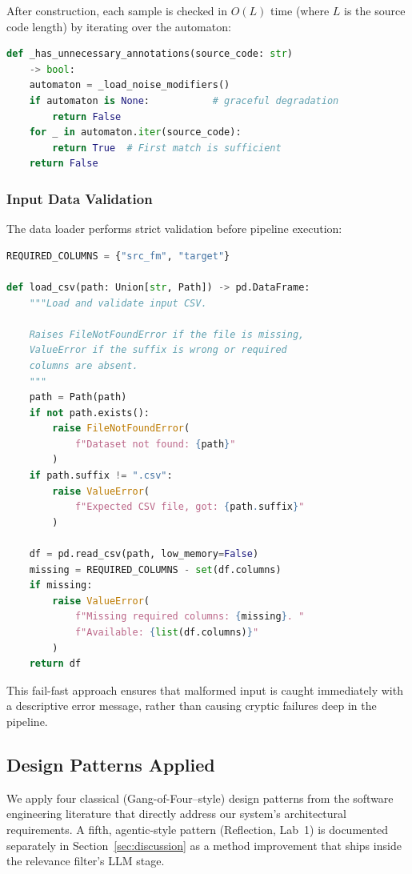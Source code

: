 \documentclass[acmlarge,nonacm,screen]{acmart}
\begin{document}
After construction, each sample is checked in $O(L)$ time (where $L$ is the source code length) by iterating over the automaton:

\begin{lstlisting}[language=Python,caption={O(L) annotation noise detection}]
def _has_unnecessary_annotations(source_code: str)
    -> bool:
    automaton = _load_noise_modifiers()
    if automaton is None:           # graceful degradation
        return False
    for _ in automaton.iter(source_code):
        return True  # First match is sufficient
    return False
\end{lstlisting}

\subsubsection{Input Data Validation}

The data loader performs strict validation before pipeline execution:

\begin{lstlisting}[language=Python,caption={Input CSV validation}]
REQUIRED_COLUMNS = {"src_fm", "target"}

def load_csv(path: Union[str, Path]) -> pd.DataFrame:
    """Load and validate input CSV.

    Raises FileNotFoundError if the file is missing,
    ValueError if the suffix is wrong or required
    columns are absent.
    """
    path = Path(path)
    if not path.exists():
        raise FileNotFoundError(
            f"Dataset not found: {path}"
        )
    if path.suffix != ".csv":
        raise ValueError(
            f"Expected CSV file, got: {path.suffix}"
        )

    df = pd.read_csv(path, low_memory=False)
    missing = REQUIRED_COLUMNS - set(df.columns)
    if missing:
        raise ValueError(
            f"Missing required columns: {missing}. "
            f"Available: {list(df.columns)}"
        )
    return df
\end{lstlisting}

This fail-fast approach ensures that malformed input is caught immediately with a descriptive error message, rather than causing cryptic failures deep in the pipeline.

\subsection{Design Patterns Applied}

We apply four classical (Gang-of-Four--style) design patterns from
the software engineering literature that directly address our
system's architectural requirements. A fifth, agentic-style pattern
(Reflection, Lab~1) is documented separately in
Section~\ref{sec:discussion} as a method improvement that ships
inside the relevance filter's LLM stage.
\end{document}
